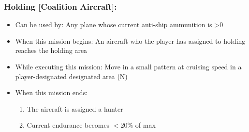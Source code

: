 \documentclass{article}
\begin{document}
    \subsubsection{Holding [Coalition Aircraft]:}
            \begin{itemize}
                \item{Can be used by:} Any plane whose current anti-ship ammunition is \textgreater 0
                \item{When this mission begins:} An aircraft who the player has assigned to holding reaches the holding area
                \item{While executing this mission:} Move in a small pattern at cruising speed in a player-designated designated area (N)
                \item{When this mission ends:} 
                \begin{enumerate}[label=\arabic*)]
                    \item The aircraft is assigned a hunter \par
                    [Aircraft gains Tracking mission on its target]
                    \item Current endurance becomes $<20\%$ of max \par
                    [Aircraft begins mission Return to Base]
                \end{enumerate}
            \end{itemize}
\end{document}
